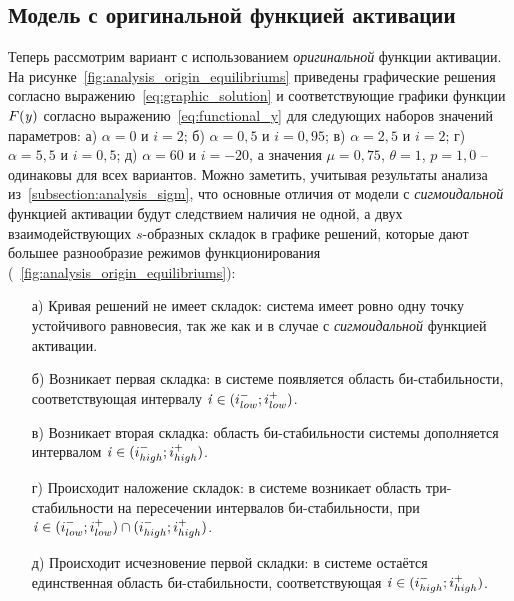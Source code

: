 %
%

\subsection{Модель с оригинальной функцией активации}  \label{subsection:analysis_origin}

Теперь рассмотрим вариант с использованием \textit{оригинальной} функции активации. На рисунке~\ref{fig:analysis_origin_equilibriums} приведены графические решения согласно выражению~\eqref{eq:graphic_solution} и соответствующие графики функции $F(\mathit{y})$ согласно выражению~\eqref{eq:functional_y} для следующих наборов значений параметров: а) $\alpha = 0  $ и $i =  2   $; б) $\alpha = 0,5$ и $i =  0,95$; в) $\alpha = 2,5$ и $i =  2   $; г) $\alpha = 5,5$ и $i =  0,5 $; д) $\alpha = 60 $ и $i = -20$, а значения  $\mu = 0,75$, $\theta = 1$, $p = 1,0$ -- одинаковы для всех вариантов. Можно заметить, учитывая результаты анализа из~\autoref{subsection:analysis_sigm}, что основные отличия от модели с \textit{сигмоидальной} функцией активации будут следствием наличия не одной, а двух взаимодействующих $s$-образных складок в графике решений, которые дают большее разнообразие режимов функционирования (\seefigure~\ref{fig:analysis_origin_equilibriums}):
\begin{itemize}
    \item[а)] Кривая решений не имеет складок: система имеет ровно одну точку устойчивого равновесия, так же как и в случае с \textit{сигмоидальной} функцией активации.
    \item[б)] Возникает первая складка: в системе появляется область би-стабильности, соответствующая интервалу $\mathit{i} \in (i_{low}^{-}; i_{low}^{+})$.
    \item[в)] Возникает вторая складка: область би-стабильности системы дополняется интервалом $\mathit{i} \in (i_{high}^{-}; i_{high}^{+})$.
    \item[г)] Происходит наложение складок: в системе возникает область три-стабильности на пересечении интервалов би-стабильности, \ie при $\mathit{i} \in (i_{low}^{-}; i_{low}^{+}) \cap (i_{high}^{-}; i_{high}^{+})$.
    \item[д)] Происходит исчезновение первой складки: в системе остаётся единственная область би-стабильности, соответствующая $\mathit{i} \in (i_{high}^{-}; i_{high}^{+})$.
\end{itemize}

